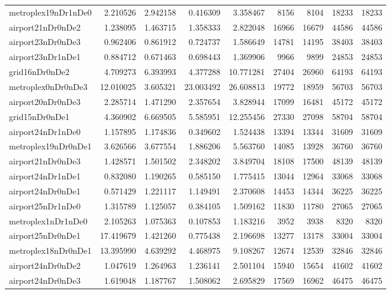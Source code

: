 \begin{longtable}{|l|r|r|r|r|r|r|r|r|}
metroplex19nDr1nDe0 & 2.210526 & 2.942158 & 0.416309 & 3.358467 & 8156 & 8104 & 18233 & 18233 \\
airport21nDr0nDe2 & 1.238095 & 1.463715 & 1.358333 & 2.822048 & 16966 & 16679 & 44586 & 44586 \\
airport23nDr0nDe3 & 0.962406 & 0.861912 & 0.724737 & 1.586649 & 14781 & 14195 & 38403 & 38403 \\
airport23nDr1nDe1 & 0.884712 & 0.671463 & 0.698443 & 1.369906 & 9966 & 9899 & 24853 & 24853 \\
grid16nDr0nDe2 & 4.709273 & 6.393993 & 4.377288 & 10.771281 & 27404 & 26960 & 64193 & 64193 \\
metroplex0nDr0nDe3 & 12.010025 & 3.605321 & 23.003492 & 26.608813 & 19772 & 18959 & 56703 & 56703 \\
airport20nDr0nDe3 & 2.285714 & 1.471290 & 2.357654 & 3.828944 & 17099 & 16481 & 45172 & 45172 \\
grid15nDr0nDe1 & 4.360902 & 6.669505 & 5.585951 & 12.255456 & 27330 & 27098 & 58704 & 58704 \\
airport24nDr1nDe0 & 1.157895 & 1.174836 & 0.349602 & 1.524438 & 13394 & 13344 & 31609 & 31609 \\
metroplex19nDr0nDe1 & 3.626566 & 3.677554 & 1.886206 & 5.563760 & 14085 & 13928 & 36760 & 36760 \\
airport21nDr0nDe3 & 1.428571 & 1.501502 & 2.348202 & 3.849704 & 18108 & 17500 & 48139 & 48139 \\
airport24nDr1nDe1 & 0.832080 & 1.190265 & 0.585150 & 1.775415 & 13044 & 12964 & 33068 & 33068 \\
airport24nDr0nDe1 & 0.571429 & 1.221117 & 1.149491 & 2.370608 & 14453 & 14344 & 36225 & 36225 \\
airport25nDr1nDe0 & 1.315789 & 1.125057 & 0.384105 & 1.509162 & 11830 & 11780 & 27065 & 27065 \\
metroplex1nDr1nDe0 & 2.105263 & 1.075363 & 0.107853 & 1.183216 & 3952 & 3938 & 8320 & 8320 \\
airport25nDr0nDe1 & 17.419679 & 1.421260 & 0.775438 & 2.196698 & 13277 & 13178 & 33004 & 33004 \\
metroplex18nDr0nDe1 & 13.395990 & 4.639292 & 4.468975 & 9.108267 & 12674 & 12539 & 32846 & 32846 \\
airport24nDr0nDe2 & 1.047619 & 1.264963 & 1.236141 & 2.501104 & 15940 & 15654 & 41602 & 41602 \\
airport24nDr0nDe3 & 1.619048 & 1.187767 & 1.508062 & 2.695829 & 17569 & 16962 & 46475 & 46475 \\

\end{longtable}
